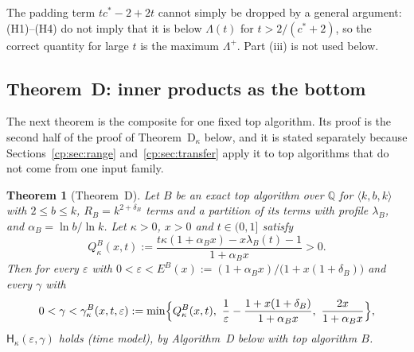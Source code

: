 \documentclass[11pt]{article}
\newtheorem{theorem}{Theorem}[section]
\theoremstyle{definition}
\theoremstyle{remark}
\providecommand{\eps}{\varepsilon}
\providecommand{\Q}{\mathbb{Q}}
\newcommand{\mat}[3]{\langle #1,#2,#3\rangle} %
\newcommand{\Hypk}[1]{\mathsf{H}_{#1}}        %
\newcommand{\lamB}{\lambda_B}                 %
\newcommand{\delB}{\delta_B}                  %
\newcommand{\alB}{\alpha_B}                   %
\newcommand{\RB}{R_B}                         %
\newcommand{\Lam}{\Lambda}                    %
\newcommand{\Lamp}{\Lambda^{+}}               %
\newcommand{\cstar}{c^{*}}                    %
\newcommand{\Hcond}[1]{\textup{(H#1)}}        %
\newcommand{\ThmD}{Theorem~D}                               %
\newcommand{\ThmDk}{Theorem~D\texorpdfstring{\ensuremath{_\kappa}}{\_kappa}}     %
\newcommand{\AlgD}{Algorithm~D}                             %
\newcommand{\Qgain}[2]{Q^{#1}_{#2}}           %
\newcommand{\Erange}[1]{E^{#1}}               %
\newcommand{\gbound}[2]{\gamma^{#1}_{#2}}     %
\begin{document}
The padding term $t\cstar-2+2t$ cannot simply be dropped by a general argument: \Hcond1--\Hcond4 do not imply that it is below $\Lam(t)$ for $t>2/(\cstar+2)$, so the correct quantity for large $t$ is the maximum $\Lamp$. Part (iii) is not used below.

\subsection{\texorpdfstring{\ThmD}{Theorem D}: inner products as the bottom}\label{cp:sec:thmD}

The next theorem is the composite for one fixed top algorithm. Its proof is the second half of the proof of \ThmDk{} below, and it is stated separately because Sections~\ref{cp:sec:range} and~\ref{cp:sec:transfer} apply it to top algorithms that do not come from one input family.

\begin{theorem}[\ThmD]\label{cp:T6}
Let $B$ be an exact top algorithm over $\Q$ for $\mat kbk$ with $2\le b\le k$, $\RB=k^{2+\delB}$ terms and a partition of its terms with profile $\lamB$, and $\alB=\ln b/\ln k$. Let $\kappa>0$, $x>0$ and $t\in(0,1]$ satisfy
\[
\Qgain B\kappa(x,t):=\frac{t\kappa(1+\alB x)-x\lamB(t)-1}{1+\alB x}>0. \tag{D1$^B$}
\]
Then for every $\eps$ with $0<\eps<\Erange B(x):=(1+\alB x)/\bigl(1+x(1+\delB)\bigr)$ and every $\gamma$ with
\[
0<\gamma<\gbound B\kappa(x,t,\eps):=\min\Bigl\{\Qgain B\kappa(x,t),\ \frac1\eps-\frac{1+x(1+\delB)}{1+\alB x},\ \frac{2x}{1+\alB x}\Bigr\},
\]
$\Hypk\kappa(\eps,\gamma)$ holds (time model), by \AlgD{} below with top algorithm $B$.
\end{theorem}
\end{document}
